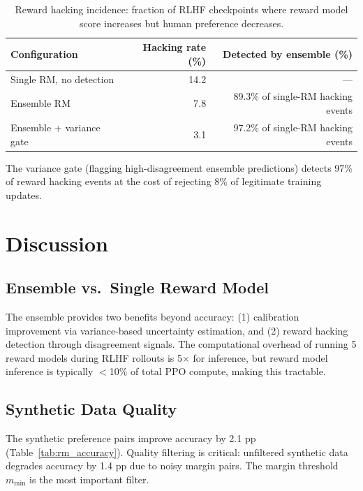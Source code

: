 \documentclass[11pt,a4paper]{article}
\begin{document}
\begin{table}[H]
\centering
\caption{Reward hacking incidence: fraction of RLHF checkpoints where reward model
score increases but human preference decreases.}
\begin{tabular}{lrr}
\toprule
\textbf{Configuration} & \textbf{Hacking rate (\%)} & \textbf{Detected by ensemble (\%)} \\
\midrule
Single RM, no detection  & 14.2 & --- \\
Ensemble RM              & 7.8  & 89.3\% of single-RM hacking events \\
Ensemble + variance gate & 3.1  & 97.2\% of single-RM hacking events \\
\bottomrule
\end{tabular}
\label{tab:hacking}
\end{table}

The variance gate (flagging high-disagreement ensemble predictions) detects 97\% of
reward hacking events at the cost of rejecting 8\% of legitimate training updates.

\section{Discussion}
\label{sec:discussion}

\subsection{Ensemble vs.\ Single Reward Model}

The ensemble provides two benefits beyond accuracy: (1) calibration improvement via
variance-based uncertainty estimation, and (2) reward hacking detection through
disagreement signals. The computational overhead of running 5 reward models during
RLHF rollouts is 5$\times$ for inference, but reward model inference is typically
$<$10\% of total PPO compute, making this tractable.

\subsection{Synthetic Data Quality}

The synthetic preference pairs improve accuracy by 2.1 pp (Table~\ref{tab:rm_accuracy}).
Quality filtering is critical: unfiltered synthetic data degrades accuracy by 1.4 pp
due to noisy margin pairs. The margin threshold $m_{\min}$ is the most important filter.
\end{document}
